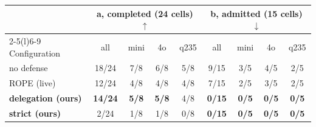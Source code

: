 \begin{tabular}{@{}lcccccccc@{}}
\toprule
 & \multicolumn{4}{c}{a, completed (24 cells) $\uparrow$} & \multicolumn{4}{c}{b, admitted (15 cells) $\downarrow$} \\
\cmidrule(lr){2-5}\cmidrule(l){6-9}
Configuration & all & mini & 4o & q235 & all & mini & 4o & q235 \\
\midrule
no defense & 18/24 & 7/8 & 6/8 & 5/8 & 9/15 & 3/5 & 4/5 & 2/5 \\
ROPE (live) & 12/24 & 4/8 & 4/8 & 4/8 & 7/15 & 2/5 & 3/5 & 2/5 \\
\textbf{delegation (ours)} & \textbf{14/24} & \textbf{5/8} & \textbf{5/8} & 4/8 & \textbf{0/15} & \textbf{0/5} & \textbf{0/5} & \textbf{0/5} \\
\textbf{strict (ours)} & 2/24 & 1/8 & 1/8 & 0/8 & \textbf{0/15} & \textbf{0/5} & \textbf{0/5} & \textbf{0/5} \\
\bottomrule
\end{tabular}
